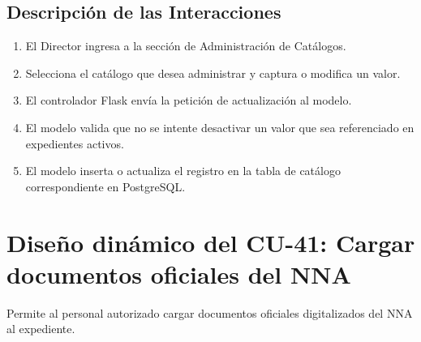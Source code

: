 \subsection{Descripción de las Interacciones}
\begin{enumerate}
    \item El Director ingresa a la sección de Administración de Catálogos.
    \item Selecciona el catálogo que desea administrar y captura o modifica un valor.
    \item El controlador Flask envía la petición de actualización al modelo.
    \item El modelo valida que no se intente desactivar un valor que sea referenciado en expedientes activos.
    \item El modelo inserta o actualiza el registro en la tabla de catálogo correspondiente en PostgreSQL.
\end{enumerate}

\cleardoublepage
\section{Diseño dinámico del CU-41: Cargar documentos oficiales del NNA}
\label{sec:disenoDinamicoCU41}

Permite al personal autorizado cargar documentos oficiales digitalizados del NNA al expediente.

